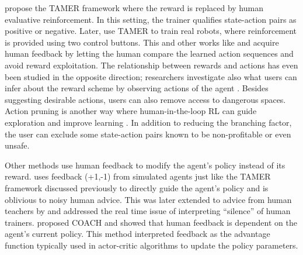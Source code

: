 \documentclass[twoside,11pt]{article}
\begin{document}
\cite{Knox:2008:TAMER} propose the TAMER framework where the reward is replaced by human evaluative reinforcement. In this setting, the trainer qualifies state-action pairs as positive or negative. Later, \cite{knox:13} use TAMER to train real robots, where reinforcement is provided using two control buttons. This and other works like \cite{Christiano:2017:DeepRLHumanPreferences} and \cite{LeeSmithAbbeel:2021:FeedbackPreferenceHITLLearningPEBBLE} acquire human feedback by letting the human compare the learned action sequences and avoid reward exploitation. The relationship between rewards and actions has even been studied in the opposite direction; researchers investigate also what users can infer about the reward scheme by observing actions of the agent \citep{Abbeel:2004:InverseRL}. Besides suggesting desirable actions, users can also remove access to dangerous spaces. Action pruning is another way where human-in-the-loop RL can guide exploration and improve learning \citep{Abel:2017:AgentAgnosticHumanInTheLoopRL}. In addition to reducing the branching factor, the user can exclude some state-action pairs known to be non-profitable or even unsafe.

Other methods use human feedback to modify the agent's policy instead of its reward. \cite{griffith2013policy} uses feedback (+1,-1) from simulated agents just like the TAMER framework discussed previously to directly guide the agent’s policy and is oblivious to noisy human advice. This was later extended to advice from human teachers by \cite{cederborg2015policy} and addressed the real time issue of interpreting “silence” of human trainers. \cite{macglashan2017interactive} proposed COACH and showed that human feedback is dependent on the agent’s current policy. This method interpreted feedback as the advantage function typically used in actor-critic algorithms to update the policy parameters.
\end{document}
